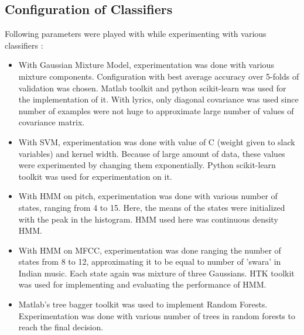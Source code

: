 \subsection{Configuration of Classifiers} Following parameters were played with while experimenting with various classifiers :
\begin{itemize}
\item With Gaussian Mixture Model, experimentation was done with various mixture components. Configuration with best average accuracy over 5-folds of validation was chosen. Matlab toolkit and python scikit-learn was used for the implementation of it. With lyrics, only diagonal covariance was used since number of examples were not huge to approximate large number of values of covariance matrix.

\item With SVM, experimentation was done with value of C (weight given to slack variables) and kernel width. Because of large amount of data, these values were experimented by changing them exponentially. Python scikit-learn toolkit was used for experimentation on it.
\item With HMM on pitch, experimentation was done with various number of states, ranging from 4 to 15. Here, the means of the states were initialized with the peak in the histogram. HMM used here was continuous density HMM.
\item With HMM on MFCC, experimentation was done ranging the number of states from 8 to 12, approximating it to be equal to number of 'swara' in Indian music. Each state again was mixture of three Gaussians. HTK toolkit was used for implementing and evaluating the performance of HMM.
\item Matlab's tree bagger toolkit was used to implement Random Forests. Experimentation was done with various number of trees in random forests to reach the final decision.
\end{itemize}
